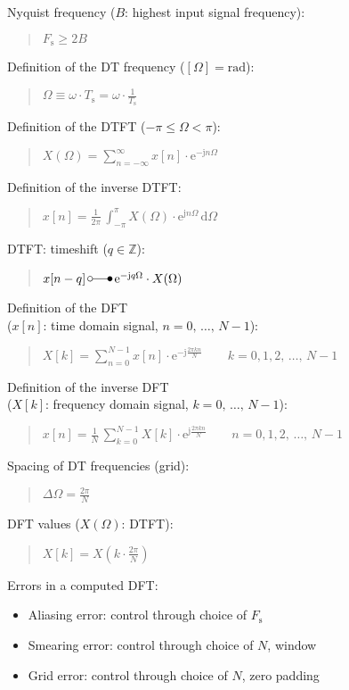 \documentclass[fontsize=9pt,a4paper,twocolumn]{scrartcl}
\begin{document}
Nyquist frequency ($B$: highest input signal frequency):
\begin{quote}
	$F_\mathrm{s}\geq 2B$
\end{quote}

Definition of the DT frequency ($[\Omega] = \mathrm{rad}$):
\begin{quote}
	$\Omega\equiv \omega\cdot T_\mathrm{s} = \omega\cdot\frac{1}{T_\mathrm{s}}$
\end{quote}

Definition of the DTFT ($-\pi\leq\Omega<\pi$):
\begin{quote}
	$X(\Omega) = \sum_{n=-\infty}^\infty x[n]\cdot\mathrm{e}^{-\mathrm{j}n\Omega}$
\end{quote}

Definition of the inverse DTFT:
\begin{quote}
	$x[n] = \frac{1}{2\pi}\,\int_{-\pi}^\pi X(\Omega)\cdot\mathrm{e}^{\mathrm{j}n\Omega}\,\mathrm{d}\Omega$
\end{quote}

DTFT: timeshift ($q\in\mathbb{Z}$):
\begin{quote}
	$x[n-q]\,\laplace\,\mathrm{e}^{-\mathrm{j}q\Omega}\cdot X(\Omega)$
\end{quote}

Definition of the DFT\\ ($x[n]$: time domain signal, $n=0,\,\dots,\,N-1$):
\begin{quote}
	$X[k]=\sum_{n=0}^{N-1} x[n]\cdot\mathrm{e}^{-\mathrm{j}\frac{2\pi kn}{N}}\qquad k=0,1,2,\,\dots,\,N-1$
\end{quote}

Definition of the inverse DFT\\ ($X[k]$: frequency domain signal, $k=0,\,\dots,\,N-1$):
\begin{quote}
	$x[n] = \frac{1}{N}\,\sum_{k=0}^{N-1} X[k]\cdot\mathrm{e}^{\mathrm{j}\frac{2\pi kn}{N}}\qquad n=0,1,2,\,\dots,\,N-1$
\end{quote}

Spacing of DT frequencies (grid):
\begin{quote}
	$\Delta\Omega = \frac{2\pi}{N}$
\end{quote}

DFT values ($X(\Omega)$: DTFT):
\begin{quote}
	$X[k] = X\left(k\cdot\frac{2\pi}{N}\right)$
\end{quote}

Errors in a computed DFT:
\begin{itemize}
	\item Aliasing error: control through choice of $F_\mathrm{s}$ 
	\item Smearing error: control through choice of $N$, window
	\item Grid error: control through choice of $N$, zero padding
\end{itemize}
\end{document}
